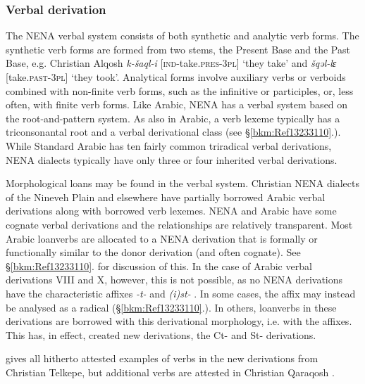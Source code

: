 \documentclass[output=paper]{langsci/langscibook}
\begin{document}
\subsubsection{\label{bkm:Ref13233345}Verbal derivation}

The NENA verbal system consists of both synthetic and analytic verb forms. The synthetic verb forms are formed from two stems, the Present Base and the Past Base, e.g. Christian Alqosh \textit{k\nobreakdash-šaql\nobreakdash-i} [\textsc{ind\nobreakdash-}take.\textsc{pres\nobreakdash-3pl]} ‘they take’ and \textit{šqəl\nobreakdash-lɛ} [take.\textsc{past\nobreakdash-3pl}] ‘they took’. Analytical forms involve auxiliary verbs or verboids combined with non-finite verb forms, such as the infinitive or participles, or, less often, with finite verb forms. Like Arabic, NENA has a verbal system based on the root-and-pattern system. As also in Arabic, a verb lexeme typically has a triconsonantal root and a verbal derivational class (see §\ref{bkm:Ref13233110}.). While Standard Arabic has ten fairly common triradical verbal derivations, NENA dialects typically have only three or four inherited verbal derivations.

Morphological loans may be found in the verbal system. Christian NENA dialects of the Nineveh Plain and elsewhere have partially borrowed Arabic verbal derivations along with borrowed verb lexemes. NENA and Arabic have some cognate verbal derivations and the relationships are relatively transparent. Most Arabic loanverbs are allocated to a NENA derivation that is formally or functionally similar to the donor derivation (and often cognate). See §\ref{bkm:Ref13233110}. for discussion of this. In the case of Arabic verbal derivations VIII and X, however, this is not possible, as no NENA derivations have the characteristic affixes \textit{{}-t-} and \textit{(i)st-} . In some cases, the affix may instead be analysed as a radical (§\ref{bkm:Ref13233110}.). In others, loanverbs in these derivations are borrowed with this derivational morphology, i.e. with the affixes. This has, in effect, created new derivations, the Ct- and St- derivations.

 gives all hitherto attested examples of verbs in the new derivations from Christian Telkepe, but additional verbs are attested in Christian Qaraqosh \citep[130]{Khan2002}.
\end{document}
